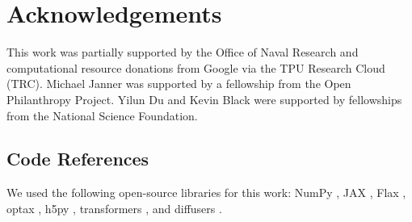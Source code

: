 \section{Acknowledgements}

This work was partially supported by the Office of Naval Research and computational resource donations from Google via the TPU Research Cloud (TRC).
Michael Janner was supported by a fellowship from the Open Philanthropy Project.
Yilun Du and Kevin Black were supported by fellowships from the National Science Foundation.

\subsection*{Code References}
We used the following open-source libraries for this work: NumPy \citep{harris2020numpy}, JAX \citep{jax2018github}, Flax \citep{flax2020github}, optax \citep{deepmind2020jax}, h5py \citep{collette_python_hdf5_2014}, transformers \citep{wolf-etal-2020-transformers}, and diffusers \citep{von-platen-etal-2022-diffusers}.